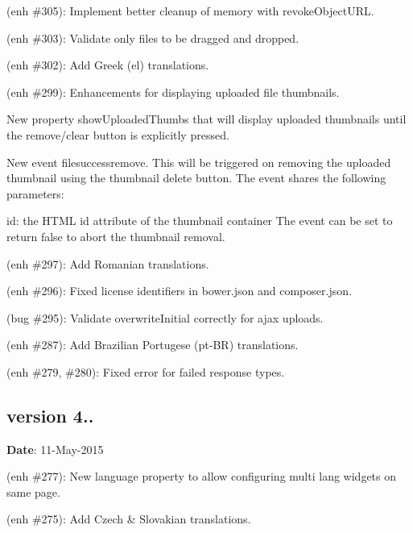 \begin{DoxyItemize}
\item (enh \#305)\+: Implement better cleanup of memory with {\ttfamily revoke\+Object\+U\+RL}.
\item (enh \#303)\+: Validate only files to be dragged and dropped.
\item (enh \#302)\+: Add Greek (el) translations.
\item (enh \#299)\+: Enhancements for displaying uploaded file thumbnails.
\begin{DoxyItemize}
\item New property {\ttfamily show\+Uploaded\+Thumbs} that will display uploaded thumbnails until the remove/clear button is explicitly pressed.
\item New event {\ttfamily filesuccessremove}. This will be triggered on removing the uploaded thumbnail using the thumbnail delete button. The event shares the following parameters\+:
\begin{DoxyItemize}
\item {\ttfamily id}\+: the H\+T\+ML id attribute of the thumbnail container The {\ttfamily event} can be set to return {\ttfamily false} to abort the thumbnail removal.
\end{DoxyItemize}
\end{DoxyItemize}
\item (enh \#297)\+: Add Romanian translations.
\item (enh \#296)\+: Fixed license identifiers in bower.\+json and composer.\+json.
\item (bug \#295)\+: Validate {\ttfamily overwrite\+Initial} correctly for ajax uploads.
\item (enh \#287)\+: Add Brazilian Portugese (pt-\/\+BR) translations.
\item (enh \#279, \#280)\+: Fixed error for failed response types.
\end{DoxyItemize}

\subsection*{version 4..}

{\bfseries Date}\+: 11-\/\+May-\/2015


\begin{DoxyItemize}
\item (enh \#277)\+: New {\ttfamily language} property to allow configuring multi lang widgets on same page.
\item (enh \#275)\+: Add Czech \& Slovakian translations.
\end{DoxyItemize}

